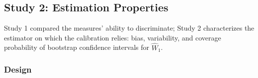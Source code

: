 \documentclass[AMA,Times1COL]{WileyNJDv5}
\begin{document}



\subsection{Study 2: Estimation Properties}\label{sec:study2}

Study 1 compared the measures' ability to discriminate; Study 2 characterizes the estimator on which the calibration relies: bias, variability, and coverage probability of bootstrap confidence intervals for $\widehat{W}_1$. 

\subsubsection{Design}\label{sec:sim_design}
\end{document}

